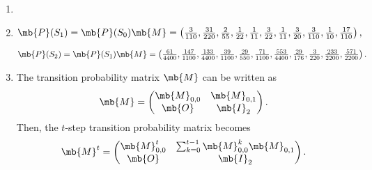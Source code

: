 \begin{exercise}
\begin{enumerate}
            \begin{solution}
                \begin{enumerate}
                    \item []
                    \item
                        $
                            \mb{P}(S_1) = \mb{P}(S_0)\mb{M} = \left(\frac{3}{110}, \frac{31}{220}, \frac{2}{55}, \frac{1}{22}, \frac{1}{11}, \frac{3}{22}, \frac{1}{11}, \frac{3}{20}, \frac{3}{110}, \frac{1}{10}, \frac{17}{110}\right),
                        $

                        $
                            \mb{P}(S_2) = \mb{P}(S_1)\mb{M} = \left(\frac{61}{4400}, \frac{147}{1100}, \frac{133}{4400}, \frac{39}{1100}, \frac{29}{550}, \frac{71}{1100}, \frac{553}{4400}, \frac{29}{176}, \frac{3}{220}, \frac{233}{2200}, \frac{571}{2200}\right).
                        $
                    \item
                        The transition probability matrix $\mb{M}$ can be written as
                        \begin{align*}
                            \mb{M} = \begin{pmatrix}
                                         \mb{M}_{0,0} & \mb{M}_{0,1} \\
                                         \mb{O}       & \mb{I}_2
                                     \end{pmatrix}.
                        \end{align*}
                        Then, the $t$-step transition probability matrix becomes
                        \begin{align*}
                            \mb{M}^t = \begin{pmatrix}
                                           \mb{M}_{0,0}^t & \sum_{k=0}^{t-1}\mb{M}_{0,0}^k\mb{M}_{0,1} \\
                                           \mb{O}         & \mb{I}_2
                                       \end{pmatrix}.

\end{align*}
\end{enumerate}
\end{solution}
\end{enumerate}
\end{exercise}
